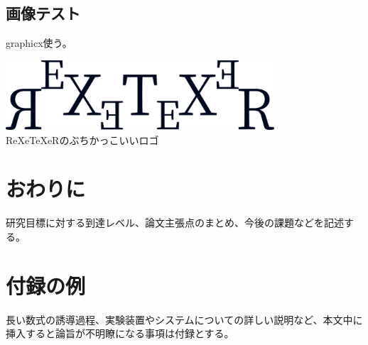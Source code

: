 \documentclass[a4paper, titlepage]{bxjsreport}
\begin{document}
  \subsection{画像テスト}
  graphicx使う。
  \begin{center}
    \includegraphics[width=10cm]{img/logo.png} \\
    ReXeTeXeRのぶちかっこいいロゴ
  \end{center}

  \section{おわりに}
  研究目標に対する到達レベル、論文主張点のまとめ、今後の課題などを記述する。

  
  

  \appendix
  \section{付録の例}
  長い数式の誘導過程、実験装置やシステムについての詳しい説明など、本文中に挿入すると論旨が不明瞭になる事項は付録とする。
\end{document}
